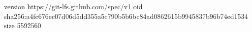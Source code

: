 version https://git-lfs.github.com/spec/v1
oid sha256:a4fc676ec07d06d5dd355a5c790b5b6bc84ad0862615b9945837b96b74ed1534
size 5592560
